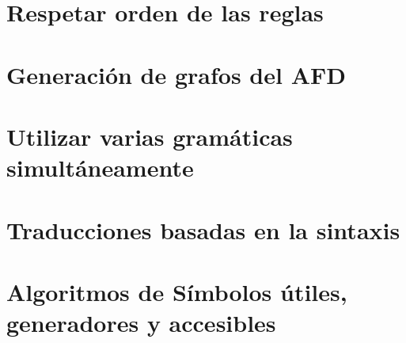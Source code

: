  \section{Respetar orden de las reglas}


 \section{Generación de grafos del AFD}


 \section{Utilizar varias gramáticas simultáneamente}



 \section{Traducciones basadas en la sintaxis}


 \section{Algoritmos de Símbolos útiles, generadores y accesibles}

